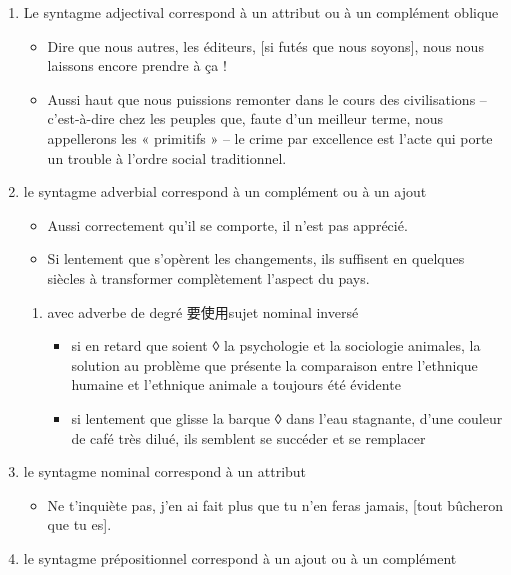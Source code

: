 \documentclass[UTF8]{report}
\begin{document}
\begin{enumerate}
    \item Le syntagme adjectival correspond à un attribut ou à un complément oblique
    \begin{itemize}
        \item Dire que nous autres, les éditeurs, [si futés que nous soyons], nous nous laissons encore prendre à ça !
        \item Aussi haut que nous puissions remonter dans le cours des civilisations – c’est-à-dire chez les peuples que, faute d’un meilleur terme, nous appellerons les « primitifs » – le crime par excellence est l’acte qui porte un trouble à l’ordre social traditionnel.
    \end{itemize}
    \item le syntagme adverbial correspond à un complément ou à un ajout
    \begin{itemize}
        \item Aussi correctement qu’il se comporte, il n’est pas apprécié.
        \item Si lentement que s’opèrent les changements, ils suffisent en quelques siècles à transformer complètement l’aspect du pays.
    \end{itemize}
    \begin{enumerate}
        \item avec adverbe de degré 要使用sujet nominal inversé
        \begin{itemize}
            \item si en retard que soient ◊ la psychologie et la sociologie animales, la solution au problème que présente la comparaison entre l’ethnique humaine et l’ethnique animale a toujours été évidente
            \item si lentement que glisse la barque ◊ dans l’eau stagnante, d’une couleur de café très dilué, ils semblent se succéder et se remplacer
        \end{itemize}
    \end{enumerate}
    \item le syntagme nominal correspond à un attribut 
    \begin{itemize}
        \item Ne t’inquiète pas, j’en ai fait plus que tu n’en feras jamais, [tout bûcheron que tu es].
    \end{itemize}
    \item le syntagme prépositionnel correspond à un ajout ou à un complément
    \begin{itemize}

\end{itemize}
\end{enumerate}
\end{document}
